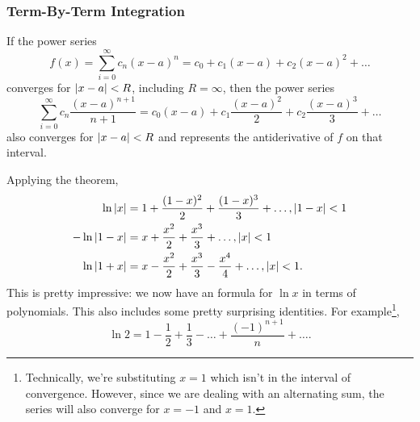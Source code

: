 \subsubsection{Term-By-Term Integration}
\begin{theorem}
	If the power series
	\begin{equation*}
		f(x) = \sum_{i=0}^{\infty}{c_n(x-a)^n} = c_0 + c_1(x-a) + c_2(x-a)^2 + \ldots
	\end{equation*}
	converges for $\lvert x-a \rvert < R$, including $R=\infty$, then the power series
	\begin{equation*}
		\sum_{i=0}^{\infty}{c_n\frac{(x-a)^{n+1}}{n+1}} = c_0(x-a) + c_1\frac{(x-a)^2}{2} + c_2\frac{(x-a)^3}{3} + \ldots
	\end{equation*}
	also converges for $\lvert x-a \rvert < R$ and represents the antiderivative of $f$ on that interval.
\end{theorem}
\noindent
Applying the theorem,
\begin{align*}
	\ln{\lvert x \rvert} &= 1 + \frac{(1-x)^2}{2} + \frac{(1-x)^3}{3} + \ldots, \lvert 1-x \rvert < 1 \\
	-\ln{\lvert 1-x \rvert} &= x + \frac{x^2}{2} + \frac{x^3}{3} + \ldots, \lvert x \rvert < 1 \\
	\ln{\lvert 1+x \rvert} &= x - \frac{x^2}{2} + \frac{x^3}{3} - \frac{x^4}{4} + \ldots, \lvert x \rvert < 1.
\end{align*}
\noindent
This is pretty impressive: we now have an formula for $\ln{x}$ in terms of polynomials.
This also includes some pretty surprising identities.
For example\footnote{Technically, we're substituting $x=1$ which isn't in the interval of convergence. However, since we are dealing with an alternating sum, the series will also converge for $x=-1$ and $x=1$.},
\begin{equation*}
	\ln{2} = 1 - \frac{1}{2} + \frac{1}{3} - \ldots + \frac{(-1)^{n+1}}{n} + \ldots.
\end{equation*}

